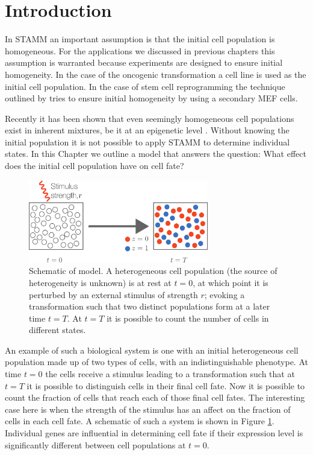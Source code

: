 \section{Introduction}
\label{sec:introduction-cell}


In STAMM an important assumption is that the initial cell population is homogeneous. For the applications we discussed in previous chapters this assumption is warranted because experiments are designed to ensure initial homogeneity. In the case of the oncogenic transformation a cell line is used as the initial cell population. In the case of stem cell reprogramming the technique outlined by \cite{Hanna:2009ix} tries to ensure initial homogeneity  by using a secondary MEF cells.

Recently it has been shown that even seemingly homogeneous cell populations exist in inherent mixtures, be it at an epigenetic level \citep{Heng:2009em,Gerlinger:2012wu}. Without knowing the initial population it is not possible to apply STAMM to determine individual states. In this Chapter we outline a model that answers the question: What effect does the initial cell population have on cell fate? 


\begin{figure}[h]
  \centering
  \includegraphics[width=0.7\textwidth]{pics/cell-cycle-model.pdf}
  \caption{Schematic of model. A heterogeneous cell population (the source of heterogeneity is unknown) is at rest at $t=0$, at which point it is perturbed by an external stimulus of strength $r$; evoking a transformation such that two distinct populations form at a later time $t=T$. At $t=T$ it is possible to count the number of cells in different states. }
  \label{fig:cell-cycle-model}
\end{figure}

An example of such a biological system is one with an initial heterogeneous cell population made up of two types of cells, with an indistinguishable phenotype. At time $t=0$ the cells receive a stimulus leading to a transformation such that at $t=T$ it is possible to distinguish cells in their final cell fate. Now it is possible to count the fraction of cells that reach each of those final cell fates. The interesting case here is when the strength of the stimulus has an affect on the fraction of cells in each cell fate. A schematic of such a system is shown in Figure \ref{fig:cell-cycle-model}. Individual genes are influential in determining cell fate if their expression level is significantly different between cell populations at $t=0$. 

